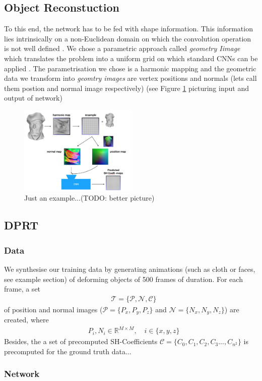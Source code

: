 \subsection{Object Reconstuction}
To this end, the network has to be fed with shape information. This information lies intrinsically on a non-Euclidean domain on which the convolution operation is not well defined \cite{Masci2015ShapeNetCN ,Geometric_deep_learning, CNN_on_Torus}. We chose a parametric approach called \textit{geometry Iimage } which translates the problem into a uniform grid on which standard CNNs can be applied \cite{gu2002geometry, sinha2016deep}. The parametrisation we chose is a harmonic mapping and the geometric data we transform into \textit{geomtry images} are vertex positions and normals (lets call them postion and normal image respectively)  (see Figure \ref{Fig: Method_Overview} picturing input and output of network)
\begin{figure}[H]
  \centering
    \includegraphics[width=0.5\textwidth]{Figures/Overview_method}
     \caption{Just an example...(TODO: better picture)}
     \label{Fig: Method_Overview}
\end{figure}
\subsection{DPRT}
\subsubsection{Data}
We synthesise our training data by generating animations (such as cloth or faces, see example section) of deforming objects of 500 frames of duration. For each frame, a set
\begin{align*}
&\mathcal{T} = \{  \mathcal{P} , \mathcal{N} , \mathcal{C}\} 
\end{align*}
of position and normal images ($\mathcal{P}= \{ P_x , P_y, P_z \} $  and $\mathcal{N}= \{ N_x , N_y, N_z \} $) are created, where 
\begin{align*}
&P_i,N_i \in \mathbb{R}^{M \times M} ,
\quad
i \in \{x,y,z\}
\end{align*}
Besides, the a set of precomputed SH-Coefficients $\mathcal{C}= \{ C_0 , C_1, C_2, C_3..., C_{n^2} \} $ is precomputed for the ground truth data...
\subsubsection{Network}




